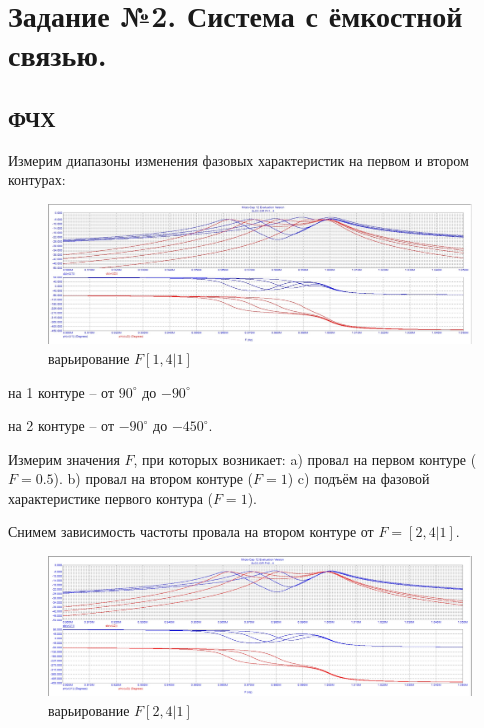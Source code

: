 \documentclass[a4paper, 14pt]{extarticle}%
\begin{document}
\newpage

\section{Задание №2. Система с ёмкостной связью.}

\subsection{ФЧХ}

Измерим диапазоны изменения фазовых характеристик на первом и втором контурах:

\begin{figure}[h!]
	\centering
			\includegraphics[width=1.1\linewidth]{2.1_varF1.jpg}
            \caption{варьирование $F  [1, 4|1]$}
	\label{A}
\end{figure}


на 1 контуре -- от $90^{\circ}$ до $-90^{\circ}$

на 2 контуре -- от $-90^{\circ}$ до $-450^{\circ}$.

Измерим значения $F$, при которых возникает:
\newline
a) провал на первом контуре ($F = 0.5$).
\newline
b) провал на втором контуре ($F = 1$) c) подъём на фазовой характеристике первого контура ($F = 1$).

Снимем зависимость частоты провала на втором контуре от $F = [2, 4|1]$.

\begin{figure}[h!]
	\centering
			\includegraphics[width=1.1\linewidth]{2.1_varF2.jpg}
            \caption{варьирование $F  [2, 4|1]$}
	\label{A}
\end{figure}
\end{document}
